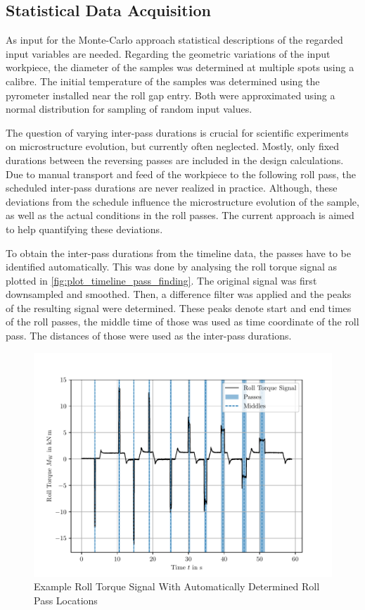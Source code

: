 \subsection{Statistical Data Acquisition}\label{subsec:data-acquisition}

As input for the Monte-Carlo approach statistical descriptions of the regarded input variables are needed.
Regarding the geometric variations of the input workpiece, the diameter of the samples was determined at multiple spots using a calibre.
The initial temperature of the samples was determined using the pyrometer installed near the roll gap entry.
Both were approximated using a normal distribution for sampling of random input values.

The question of varying inter-pass durations is crucial for scientific experiments on microstructure evolution, but currently often neglected.
Mostly, only fixed durations between the reversing passes are included in the design calculations.
Due to manual transport and feed of the workpiece to the following roll pass, the scheduled inter-pass durations are never realized in practice.
Although, these deviations from the schedule influence the microstructure evolution of the sample, as well as the actual conditions in the roll passes.
The current approach is aimed to help quantifying these deviations.

To obtain the inter-pass durations from the timeline data, the passes have to be identified automatically.
This was done by analysing the roll torque signal as plotted in \autoref{fig:plot_timeline_pass_finding}.
The original signal was first downsampled and smoothed.
Then, a difference filter was applied and the peaks of the resulting signal were determined.
These peaks denote start and end times of the roll passes, the middle time of those was used as time coordinate of the roll pass.
The distances of those were used as the inter-pass durations.

\begin{figure}
    \centering
    \includegraphics{img/plot_timeline_pass_finding}
    \caption{Example Roll Torque Signal With Automatically Determined Roll Pass Locations}
    \label{fig:plot_timeline_pass_finding}
\end{figure}

